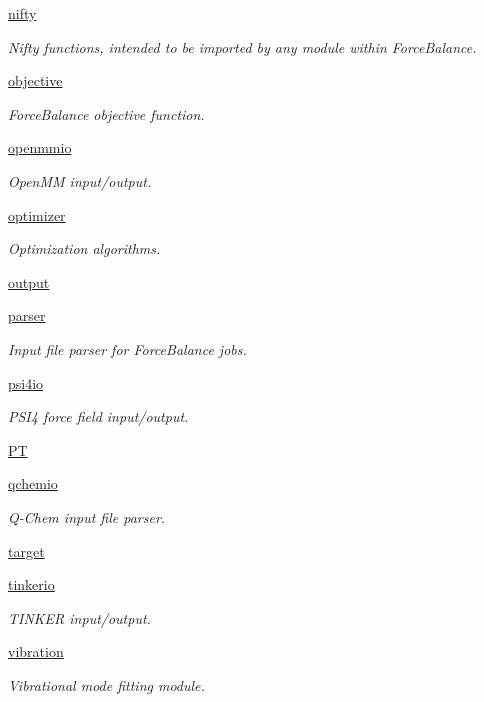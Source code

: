 \begin{DoxyCompactItemize}
\hyperlink{namespaceforcebalance_1_1nifty}{nifty}
\begin{DoxyCompactList}\small\item\em Nifty functions, intended to be imported by any module within Force\-Balance. \end{DoxyCompactList}\item 
\hyperlink{namespaceforcebalance_1_1objective}{objective}
\begin{DoxyCompactList}\small\item\em Force\-Balance objective function. \end{DoxyCompactList}\item 
\hyperlink{namespaceforcebalance_1_1openmmio}{openmmio}
\begin{DoxyCompactList}\small\item\em Open\-M\-M input/output. \end{DoxyCompactList}\item 
\hyperlink{namespaceforcebalance_1_1optimizer}{optimizer}
\begin{DoxyCompactList}\small\item\em Optimization algorithms. \end{DoxyCompactList}\item 
\hyperlink{namespaceforcebalance_1_1output}{output}
\item 
\hyperlink{namespaceforcebalance_1_1parser}{parser}
\begin{DoxyCompactList}\small\item\em Input file parser for Force\-Balance jobs. \end{DoxyCompactList}\item 
\hyperlink{namespaceforcebalance_1_1psi4io}{psi4io}
\begin{DoxyCompactList}\small\item\em P\-S\-I4 force field input/output. \end{DoxyCompactList}\item 
\hyperlink{namespaceforcebalance_1_1PT}{P\-T}
\item 
\hyperlink{namespaceforcebalance_1_1qchemio}{qchemio}
\begin{DoxyCompactList}\small\item\em Q-\/\-Chem input file parser. \end{DoxyCompactList}\item 
\hyperlink{namespaceforcebalance_1_1target}{target}
\item 
\hyperlink{namespaceforcebalance_1_1tinkerio}{tinkerio}
\begin{DoxyCompactList}\small\item\em T\-I\-N\-K\-E\-R input/output. \end{DoxyCompactList}\item 
\hyperlink{namespaceforcebalance_1_1vibration}{vibration}
\begin{DoxyCompactList}\small\item\em Vibrational mode fitting module. \end{DoxyCompactList}\end{DoxyCompactItemize}
